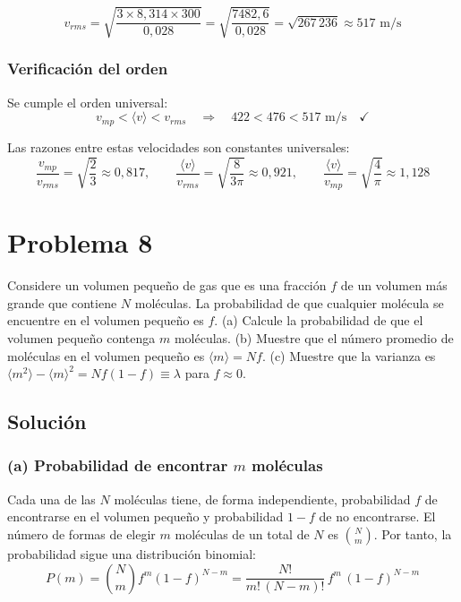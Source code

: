 \documentclass[a4paper]{article}
\begin{document}
$$
v_{rms} = \sqrt{\frac{3 \times 8{,}314 \times 300}{0{,}028}} = \sqrt{\frac{7482{,}6}{0{,}028}} = \sqrt{267\,236} \approx 517 \text{ m/s}
$$

\subsubsection{Verificación del orden}

Se cumple el orden universal:
$$
v_{mp} < \langle v \rangle < v_{rms} \quad \Longrightarrow \quad 422 < 476 < 517 \text{ m/s} \quad \checkmark
$$

Las razones entre estas velocidades son constantes universales:
$$
\frac{v_{mp}}{v_{rms}} = \sqrt{\frac{2}{3}} \approx 0{,}817, \qquad \frac{\langle v \rangle}{v_{rms}} = \sqrt{\frac{8}{3\pi}} \approx 0{,}921, \qquad \frac{\langle v \rangle}{v_{mp}} = \sqrt{\frac{4}{\pi}} \approx 1{,}128
$$

\section{Problema 8}
Considere un volumen pequeño de gas que es una fracción $f$ de un volumen más grande que contiene $N$ moléculas. La probabilidad de que cualquier molécula se encuentre en el volumen pequeño es $f$. (a) Calcule la probabilidad de que el volumen pequeño contenga $m$ moléculas. (b) Muestre que el número promedio de moléculas en el volumen pequeño es $\langle m \rangle = Nf$. (c) Muestre que la varianza es $\langle m^2 \rangle - \langle m \rangle^2 = Nf(1-f) \equiv \lambda$ para $f \approx 0$.

\subsection{Solución}

\subsubsection{(a) Probabilidad de encontrar \texorpdfstring{$m$}{m} moléculas}

Cada una de las $N$ moléculas tiene, de forma independiente, probabilidad $f$ de encontrarse en el volumen pequeño y probabilidad $1-f$ de no encontrarse. El número de formas de elegir $m$ moléculas de un total de $N$ es $\binom{N}{m}$. Por tanto, la probabilidad sigue una distribución binomial:
$$
P(m) = \binom{N}{m} f^m (1-f)^{N-m} = \frac{N!}{m!\,(N-m)!}\, f^m\, (1-f)^{N-m}
$$
\end{document}
